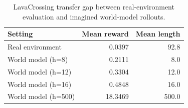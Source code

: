 \begin{table}[t]
\centering
\small
\begin{tabular}{lrr}
\toprule
Setting & Mean reward & Mean length \\
\midrule
Real environment & 0.0397 & 92.8 \\
World model (h=8) & 0.2111 & 8.0 \\
World model (h=12) & 0.3304 & 12.0 \\
World model (h=16) & 0.4848 & 16.0 \\
World model (h=500) & 18.3469 & 500.0 \\
\bottomrule
\end{tabular}
\caption{LavaCrossing transfer gap between real-environment evaluation and imagined world-model rollouts.}
\label{tab:transfer_gap}
\end{table}
